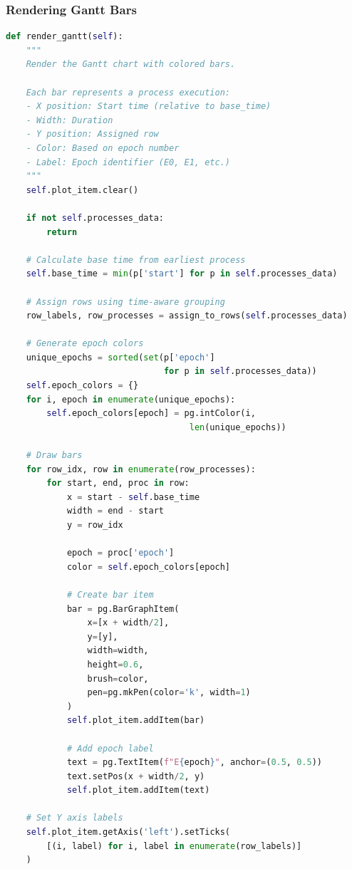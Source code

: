 \documentclass[11pt,a4paper]{article}
\begin{document}
\subsubsection{Rendering Gantt Bars}

\begin{lstlisting}[language=Python]
def render_gantt(self):
    """
    Render the Gantt chart with colored bars.
    
    Each bar represents a process execution:
    - X position: Start time (relative to base_time)
    - Width: Duration
    - Y position: Assigned row
    - Color: Based on epoch number
    - Label: Epoch identifier (E0, E1, etc.)
    """
    self.plot_item.clear()
    
    if not self.processes_data:
        return
    
    # Calculate base time from earliest process
    self.base_time = min(p['start'] for p in self.processes_data)
    
    # Assign rows using time-aware grouping
    row_labels, row_processes = assign_to_rows(self.processes_data)
    
    # Generate epoch colors
    unique_epochs = sorted(set(p['epoch'] 
                               for p in self.processes_data))
    self.epoch_colors = {}
    for i, epoch in enumerate(unique_epochs):
        self.epoch_colors[epoch] = pg.intColor(i, 
                                    len(unique_epochs))
    
    # Draw bars
    for row_idx, row in enumerate(row_processes):
        for start, end, proc in row:
            x = start - self.base_time
            width = end - start
            y = row_idx
            
            epoch = proc['epoch']
            color = self.epoch_colors[epoch]
            
            # Create bar item
            bar = pg.BarGraphItem(
                x=[x + width/2],
                y=[y],
                width=width,
                height=0.6,
                brush=color,
                pen=pg.mkPen(color='k', width=1)
            )
            self.plot_item.addItem(bar)
            
            # Add epoch label
            text = pg.TextItem(f"E{epoch}", anchor=(0.5, 0.5))
            text.setPos(x + width/2, y)
            self.plot_item.addItem(text)
    
    # Set Y axis labels
    self.plot_item.getAxis('left').setTicks(
        [(i, label) for i, label in enumerate(row_labels)]
    )
\end{lstlisting}
\end{document}
